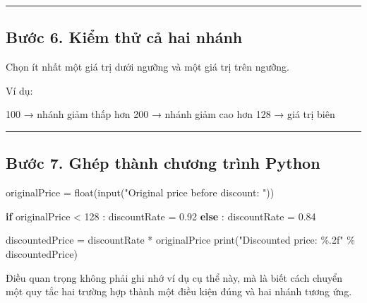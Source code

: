 \documentclass[
  11pt,
  a4paper,
]{article}
\newenvironment{Shaded}{}{}
\newcommand{\BuiltInTok}[1]{\textcolor[rgb]{0.00,0.50,0.00}{#1}}
\newcommand{\ControlFlowTok}[1]{\textcolor[rgb]{0.00,0.44,0.13}{\textbf{#1}}}
\newcommand{\DecValTok}[1]{\textcolor[rgb]{0.25,0.63,0.44}{#1}}
\newcommand{\FloatTok}[1]{\textcolor[rgb]{0.25,0.63,0.44}{#1}}
\newcommand{\NormalTok}[1]{#1}
\newcommand{\OperatorTok}[1]{\textcolor[rgb]{0.40,0.40,0.40}{#1}}
\newcommand{\SpecialCharTok}[1]{\textcolor[rgb]{0.25,0.44,0.63}{#1}}
\newcommand{\StringTok}[1]{\textcolor[rgb]{0.25,0.44,0.63}{#1}}
\begin{document}
\begin{center}\rule{0.5\linewidth}{0.5pt}\end{center}

\subsection{Bước 6. Kiểm thử cả hai
nhánh}\label{bux1b0ux1edbc-6.-kiux1ec3m-thux1eed-cux1ea3-hai-nhuxe1nh}

Chọn ít nhất một giá trị dưới ngưỡng và một giá trị trên ngưỡng.

Ví dụ:

\begin{Shaded}
\begin{Highlighting}[]
\NormalTok{100  → nhánh giảm thấp hơn}
\NormalTok{200  → nhánh giảm cao hơn}
\NormalTok{128  → giá trị biên}
\end{Highlighting}
\end{Shaded}

\begin{center}\rule{0.5\linewidth}{0.5pt}\end{center}

\subsection{Bước 7. Ghép thành chương trình
Python}\label{bux1b0ux1edbc-7.-ghuxe9p-thuxe0nh-chux1b0ux1a1ng-truxecnh-python}

\begin{Shaded}
\begin{Highlighting}[]
\NormalTok{originalPrice }\OperatorTok{=} \BuiltInTok{float}\NormalTok{(}\BuiltInTok{input}\NormalTok{(}\StringTok{"Original price before discount: "}\NormalTok{))}

\ControlFlowTok{if}\NormalTok{ originalPrice }\OperatorTok{\textless{}} \DecValTok{128}\NormalTok{ :}
\NormalTok{    discountRate }\OperatorTok{=} \FloatTok{0.92}
\ControlFlowTok{else}\NormalTok{ :}
\NormalTok{    discountRate }\OperatorTok{=} \FloatTok{0.84}

\NormalTok{discountedPrice }\OperatorTok{=}\NormalTok{ discountRate }\OperatorTok{*}\NormalTok{ originalPrice}
\BuiltInTok{print}\NormalTok{(}\StringTok{"Discounted price: }\SpecialCharTok{\%.2f}\StringTok{"} \OperatorTok{\%}\NormalTok{ discountedPrice)}
\end{Highlighting}
\end{Shaded}

Điều quan trọng không phải ghi nhớ ví dụ cụ thể này, mà là biết cách
chuyển một quy tắc hai trường hợp thành một điều kiện đúng và hai nhánh
tương ứng.
\end{document}
